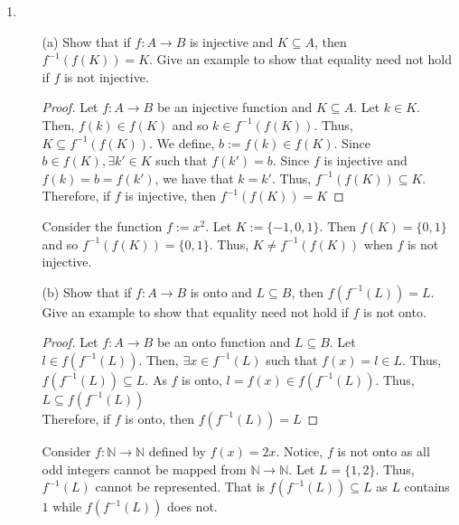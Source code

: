 \documentclass[12pt]{article}
\newcommand{\N}{\mathbb{N}}
\begin{document}
\begin{enumerate}
    \item 
    \begin{itemize}
        \item[(a)] Show that if $f : A \to B$ is injective and $K \subseteq A$, then $f^{-1}(f(K))=K$. Give an example to show that equality need not hold if $f$ is not injective.\\
        \begin{proof}
    		Let $ f:A\to B $ be an injective function and $ K\subseteq A $. Let $ k\in K $. Then, $ f(k)\in f(K) $ and so $ k\in f^{-1}(f(K)) $. Thus, $ K\subseteq f^{-1}(f(K)) $. We define, $ b := f(k)\in f(K) $. Since $ b\in f(K), \exists k'\in K $ such that $ f(k')=b $. Since  $f$ is injective and $ f(k) = b = f(k') $, we have that $ k = k' $. Thus, $ f^{-1}(f(K))\subseteq K $. Therefore, if $ f $ is injective, then $ f^{-1}(f(K)) = K $
        \end{proof}
    	Consider the function $ f:=x^2 $. Let $ K:=\{-1,0,1\} $. Then $ f(K)=\{0,1\} $ and so $ f^{-1}(f(K))=\{0,1\} $. Thus, $ K \neq f^{-1}(f(K)) $ when $ f $ is not injective.
    	
        \item[(b)]  Show that if $f : A \to B$ is onto and $L \subseteq B$, then $f(f^{-1}(L))=L$. Give an example to show that equality need not hold if $f$ is not onto.\\
	     \begin{proof}
	       	Let $ f:A\to B $ be an onto function and $ L\subseteq B $. Let $ l\in f(f^{-1}(L)) $. Then, $\exists x\in f^{-1}(L)$ such that $ f(x)=l\in L $. Thus, $ f(f^{-1}(L))\subseteq L $. As $ f $ is onto, $ l = f(x) \in f(f^{-1}(L)) $. Thus, $ L \subseteq f(f^{-1}(L)) $\\
	       	Therefore, if $ f $ is onto, then $ f(f^{-1}(L))=L $ 
	    \end{proof}
    	Consider $ f:\N\to\N $ defined by $ f(x)=2x $. Notice, $ f $ is not onto as all odd integers cannot be mapped from $ \N\to\N  $. Let $ L=\{1,2\} $. Thus, $ f^{-1}(L) $ cannot be represented. That is $ f(f^{-1}(L)) \subseteq L $ as $ L $ contains $ 1 $ while $ f(f^{-1}(L)) $ does not.
    \end{itemize}
        

\end{enumerate}
\end{document}
